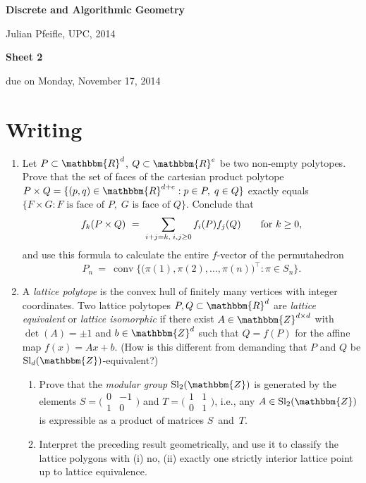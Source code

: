 \documentclass[11pt]{amsart}
\newcommand{\R}{\mathbbm{R}}
\newcommand{\Z}{\mathbbm{Z}}
\DeclareMathOperator{\conv}{conv}
\DeclareMathOperator{\Sl}{Sl}
\begin{document}
\begin{center}
\textbf{\sffamily
   Discrete and Algorithmic Geometry }

\medskip
   Julian Pfeifle,
   UPC, 2014 \mbox{}
\end{center}

\bigskip

\begin{center}
  \textbf{\sffamily Sheet 2}

\bigskip
 due on Monday, November 17, 2014

\end{center}

\bigskip
\bigskip
\bigskip

\section*{Writing}

\begin{enumerate}
\setlength{\itemsep}{2ex}
\item Let $P\subset\R^d$, $Q\subset\R^e$ be two non-empty polytopes. Prove that the set of faces of the cartesian product polytope $P\times Q=\{(p,q)\in\R^{d+e}:p\in P,\; q\in Q\}$ exactly equals $\{F\times G: F\text{ is face of }P, \;G\text{ is face of }Q\}$. Conclude that
\[
    f_k(P\times Q)
    \ = \
    \sum_{%
      i+j=k,\;i,j\ge0}f_i(P) f_j(Q)
    \qquad
    \text{for } k\ge0,
\]
and use this formula to calculate the entire $f$-vector of the permutahedron 
\[
  P_n 
  \ = \ 
  \conv\big\{\big(\pi(1),\pi(2),\dots,\pi(n)\big)^\top:\pi\in S_n\big\}.
\]

\item A \emph{lattice polytope} is the convex hull of finitely many
  vertices with integer coordinates. Two lattice polytopes
  $P,Q\subset\R^d$ are \emph{lattice equivalent} or \emph{lattice
    isomorphic} if there exist $A\in\Z^{d\times d}$ with
  $\det(A)=\pm1$ and $b\in\Z^d$ such that $Q=f(P)$ for the affine map
  $f(x)=Ax+b$. (How is this different from demanding that $P$ and $Q$
  be $\Sl_d(\Z)$-equivalent?)

  \begin{enumerate}
  \item Prove that the \emph{modular group} $\Sl_2(\Z)$ is generated by the elements $S=
    \big(\begin{smallmatrix}
      0 & -1 \\
      1 & 0
    \end{smallmatrix}\big)$ and $T=
    \big(\begin{smallmatrix}
      1 & 1 \\
      0 & 1
    \end{smallmatrix}\big)$, i.e., any $A\in\Sl_2(\Z)$ is expressible as a product of matrices $S$~and~$T$.

  \item Interpret the preceding result geometrically, and use it to
    classify the lattice polygons with (i) no, (ii) exactly one
    strictly interior lattice point up to lattice equivalence.
  \end{enumerate}
\end{enumerate}
\end{document}
